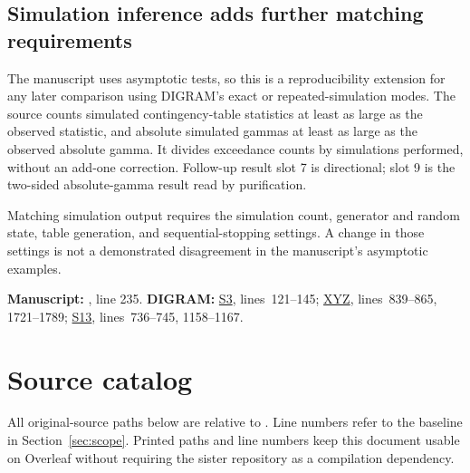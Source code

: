 \documentclass[11pt,a4paper]{article}
\newcommand{\src}[2]{\hyperlink{source-#1}{\textsf{#1}}, lines~#2}
\newcommand{\trace}[2]{%
  \par\smallskip
  {\footnotesize\color{tracegray}\textbf{Manuscript:} #1.\quad
  \textbf{DIGRAM:} #2.\par}\medskip}
\newcommand{\finding}[1]{\Needspace{5\baselineskip}\subsection{#1}}
\begin{document}
\finding{Simulation inference adds further matching requirements}
The manuscript uses asymptotic tests, so this is a reproducibility extension
for any later comparison using DIGRAM's exact or repeated-simulation modes.
The source counts simulated contingency-table statistics at least as large
as the observed statistic, and absolute simulated gammas at least as large
as the observed absolute gamma. It divides exceedance counts by simulations
performed, without an add-one correction.
Follow-up result slot 7 is directional; slot 9 is the two-sided
absolute-gamma result read by purification.

Matching simulation output requires the simulation count, generator and
random state, table generation, and sequential-stopping settings.
A change in those settings is not a demonstrated disagreement in the
manuscript's asymptotic examples.
\trace{, line 235}
{\src{S3}{121--145}; \src{XYZ}{839--865, 1721--1789};
 \src{S13}{736--745, 1158--1167}}

\section{Source catalog}
\label{sec:sources}
All original-source paths below are relative to
.
Line numbers refer to the baseline in Section~\ref{sec:scope}.
Printed paths and line numbers keep this document usable on Overleaf
without requiring the sister repository as a compilation dependency.
\end{document}
